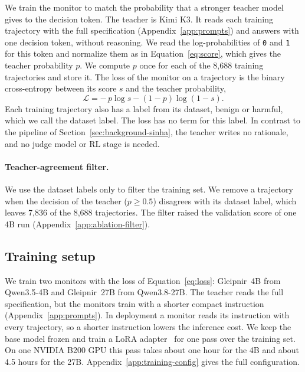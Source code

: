 We train the monitor to match the probability that a stronger teacher model gives to the decision token.
The teacher is Kimi K3.
It reads each training trajectory with the full specification (Appendix~\ref{app:prompts}) and answers with one decision token, without reasoning.
We read the log-probabilities of \texttt{0} and \texttt{1} for this token and normalize them as in Equation~\ref{eq:score}, which gives the teacher probability $p$.
We compute $p$ once for each of the 8,688 training trajectories and store it.
The loss of the monitor on a trajectory is the binary cross-entropy between its score $s$ and the teacher probability,
\begin{equation}
\mathcal{L} = -\,p \log s - (1 - p) \log (1 - s) .
\label{eq:loss}
\end{equation}
Each training trajectory also has a label from its dataset, benign or harmful, which we call the dataset label.
The loss has no term for this label.
In contrast to the pipeline of Section~\ref{sec:background-sinha}, the teacher writes no rationale, and no judge model or RL stage is needed.

\paragraph{Teacher-agreement filter.}
We use the dataset labels only to filter the training set.
We remove a trajectory when the decision of the teacher ($p \geq 0.5$) disagrees with its dataset label, which leaves 7,836 of the 8,688 trajectories.
The filter raised the validation score of one 4B run (Appendix~\ref{app:ablation-filter}).

\subsection{Training setup}
\label{sec:training-setup}

We train two monitors with the loss of Equation~\ref{eq:loss}: Gleipnir~4B from Qwen3.5-4B and Gleipnir~27B from Qwen3.8-27B.
The teacher reads the full specification, but the monitors train with a shorter compact instruction (Appendix~\ref{app:prompts}).
In deployment a monitor reads its instruction with every trajectory, so a shorter instruction lowers the inference cost.
We keep the base model frozen and train a LoRA adapter~\citep{hu2021lora} for one pass over the training set.
On one NVIDIA B200 GPU this pass takes about one hour for the 4B and about 4.5 hours for the 27B.
Appendix~\ref{app:training-config} gives the full configuration.

